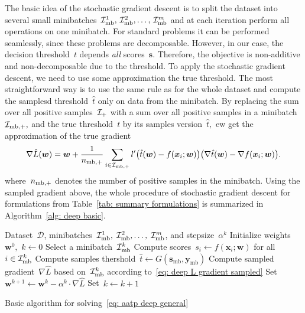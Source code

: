 The basic idea of the stochastic gradient descent is to split the dataset into several small minibatches~$\mathcal{I}_{\text{mb}}^1, \, \mathcal{I}_{\text{mb}}^2, \ldots, \, \mathcal{I}_{\text{mb}}^m$ and at each iteration perform all operations on one minibatch. For standard problems it can be performed seamlessly, since these problems are decomposable. However, in our case, the decision threshold~$t$ depends \emph{all} scores~$\bm{s}.$ Therefore, the objective is non-additive and non-decomposable due to the threshold. To apply the stochastic gradient descent, we need to use some approximation the true threshold. The most straightforward way is to use the same rule as for the whole dataset and compute the samplesd threshold~$\hat{t}$ only on data from the minibatch. By replacing the sum over all positive samples~$\mathcal{I}_{+}$ with a sum over all positive samples in a minibatch~$\mathcal{I}_{\text{mb},+},$ and the true threshold~$t$ by its samples version~$\hat{t},$ ew get the approximation of the true gradient 
\begin{equation}\label{eq: deep L gradient sampled}
  \nabla \hat{L}(\bm{w})
    = \bm{w} + \frac{1}{\nmbpos} \sum_{i \in \Imbpos} l'\Brac{\hat{t}(\bm{w}) - f(\bm{x}_i; \bm{w})}\Brac{\nabla \hat{t}(\bm{w}) - \nabla f(\bm{x}_i; \bm{w})}.
\end{equation}
where~$n_{\text{mb},+}$ denotes the number of positive samples in the minibatch. Using the sampled gradient above, the whole procedure of stochastic gradient descent for formulations from Table~\ref{tab: summary formulations} is summarized in Algorithm~\ref{alg: deep basic}.

\begin{algorithm}
  \centering
  \begin{algorithmic}[1]
    \Require Dataset~$\mathcal{D}$, minibatches~$\mathcal{I}_{\text{mb}}^1,\; \mathcal{I}_{\text{mb}}^2, \ldots, \; \mathcal{I}_{\text{mb}}^m$, and stepsize~$\alpha^k$
    \State Initialize weights~$\bm{w}^0,$ $k \gets 0$
    \Repeat
    \State Select a minibatch~$\mathcal{I}_{\text{mb}}^k$
    \State Compute scores~$s_i \gets f(\bm{x}_i; \bm{w})$ for all~$i \in \mathcal{I}_{\text{mb}}^k$
    \State Compute samples thershold~$\hat{t} \gets G(\bm{s}_{\text{mb}}, \bm{y}_{\text{mb}})$
    \State Compute sampled gradient~$\nabla \hat{L}$ based on~$\mathcal{I}_{\text{mb}}^k$ according to~\eqref{eq: deep L gradient sampled}
    \State Set~$\bm{w}^{k+1} \gets \bm{w}^k - \alpha^k \cdot \nabla \hat{L}$
    \State Set~$k \gets k + 1$
  \end{algorithmic}
  \caption{Basic algorithm for solving~\eqref{eq: aatp deep general}}
  \label{alg: deep basic}
\end{algorithm}

